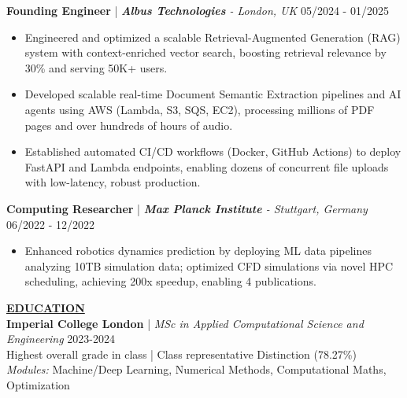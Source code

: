 \documentclass{article}
\newlength{\remaining}
\renewcommand{\section}[1]{
  \vspace{1.0em}\setlength{\remaining}{\textwidth-\widthof{\uppercase{#1}}}
    \noindent\underline{\fontsize{10}{15}\bfseries\uppercase{#1}\hspace*{\remaining}} \\
}
\renewcommand{\subsection}[3]{
    \noindent\textbf{#1} | \emph{#2} \hfill #3  
}
\begin{document}
    \subsection{Founding Engineer}{\textbf{Albus Technologies} - London, UK}{05/2024 - 01/2025}
    \begin{itemize}
        \item Engineered and optimized a scalable Retrieval-Augmented Generation (RAG) system with context-enriched vector search, boosting retrieval relevance by 30\% and serving 50K+ users.
        \item Developed scalable real-time Document Semantic Extraction pipelines and AI agents using AWS (Lambda, S3, SQS, EC2), processing millions of PDF pages and over hundreds of hours of audio.
        \item Established automated CI/CD workflows (Docker, GitHub Actions) to deploy FastAPI and Lambda endpoints, enabling dozens of concurrent file uploads with low-latency, robust production.
    \end{itemize}
    

    \subsection{Computing Researcher}{\textbf{Max Planck Institute} - Stuttgart, Germany}{06/2022 - 12/2022}
    \begin{itemize}
        \item Enhanced robotics dynamics prediction by deploying ML data pipelines analyzing 10TB simulation data; optimized CFD simulations via novel HPC scheduling, achieving 200x speedup, enabling 4 publications.
    \end{itemize}

    
    \section{Education}
    \subsection{Imperial College London}{MSc in Applied Computational Science and Engineering}{2023-2024} \\
    Highest overall grade in class | Class representative  \hfill Distinction (78.27\%) \\
    \textit{Modules:} Machine/Deep Learning, Numerical Methods, Computational Maths, Optimization
    
    \vspace{0.25em}
\end{document}
